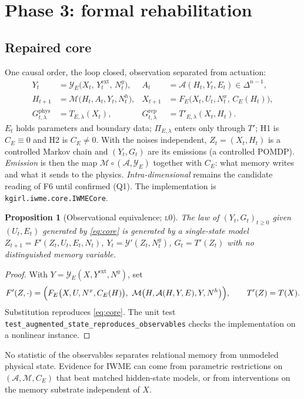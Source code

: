 \documentclass[11pt]{article}
\newtheorem{proposition}{Proposition}
\theoremstyle{definition}
\theoremstyle{remark}
\newcommand{\lvl}[1]{\textsc{l}#1}
\newcommand{\code}[1]{\texttt{#1}}
\begin{document}
\section{Phase 3: formal rehabilitation}\label{sec:phase3}

\subsection{Repaired core}\label{sec:core}
One causal order, the loop closed, observation separated from actuation:
\begin{equation}\label{eq:core}
\begin{aligned}
Y_t&=\mathcal Y_E\bigl(X_t,\,Y_t^{\mathrm{ext}},\,N^y_t\bigr), & A_t&=\mathcal A(H_t,Y_t,E_t)\in\Delta^{n-1},\\
H_{t+1}&=\mathcal M\bigl(H_t,A_t,Y_t,N^h_t\bigr), & X_{t+1}&=F_E\bigl(X_t,U_t,N^x_t,\,C_E(H_t)\bigr),\\
G^{\mathrm{phys}}_{t,\lambda}&=T_{E,\lambda}(X_t), & G^{\mathrm{rep}}_{t,\lambda}&=T'_{E,\lambda}(X_t,H_t).
\end{aligned}
\end{equation}
$E_t$ holds parameters and boundary data; $\Pi_{E,\lambda}$ enters only through $T'$; H1 is $C_E\equiv0$ and H2 is $C_E\ne0$. With the noises independent, $Z_t=(X_t,H_t)$ is a controlled Markov chain and $(Y_t,G_t)$ are its emissions (a controlled POMDP). \emph{Emission} is then the map $\mathcal M\circ(\mathcal A,\mathcal Y_E)$ together with $C_E$: what memory writes and what it sends to the physics. \emph{Intra-dimensional} remains the candidate reading of F6 until confirmed (Q1). The implementation is \code{kgirl.iwme.core.IWMECore}.

\begin{proposition}[Observational equivalence; \lvl{0}]\label{prop:P1}
The law of $(Y_t,G_t)_{t\ge0}$ given $(U_t,E_t)$ generated by \eqref{eq:core} is generated by a single-state model $Z_{t+1}=F'(Z_t,U_t,E_t,N_t)$, $Y_t=\mathcal Y'(Z_t,N^y_t)$, $G_t=T'(Z_t)$ with no distinguished memory variable.
\end{proposition}
\begin{proof}
With $Y=\mathcal Y_E(X,Y^{\mathrm{ext}},N^y)$, set
\[
F'(Z,\cdot)=\Bigl(F_E\bigl(X,U,N^x,C_E(H)\bigr),\ \mathcal M\bigl(H,\mathcal A(H,Y,E),Y,N^h\bigr)\Bigr),\qquad T'(Z)=T(X).
\]
Substitution reproduces \eqref{eq:core}. The unit test \code{test\_augmented\_state\_reproduces\_observables} checks the implementation on a nonlinear instance.
\end{proof}
No statistic of the observables separates relational memory from unmodeled physical state. Evidence for IWME can come from parametric restrictions on $(\mathcal A,\mathcal M,C_E)$ that beat matched hidden-state models, or from interventions on the memory substrate independent of $X$.
\end{document}
